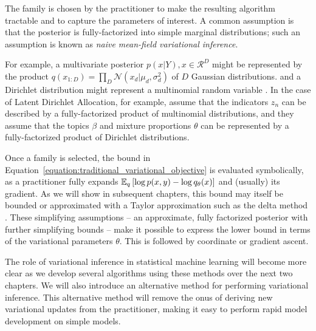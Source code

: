 The family is chosen by the practitioner to make the
resulting algorithm tractable and to capture the parameters of
interest. A common assumption is that the posterior is
fully-factorized into simple marginal distributions; such an
assumption is known as \emph{naive mean-field variational inference}.

For example, a multivariate posterior $p(x | Y), x \in \mathcal{R}^D$
might be represented by the product $q(x_{1:D}) = \prod_D \mathcal{N}(x_d | \mu_d,
\sigma_d^2)$ of $D$ Gaussian distributions. and a Dirichlet
distribution might represent a multinomial random variable
\cite{bishop:2006}.  In the case of Latent Dirichlet Allocation, for
example, \citet{blei:2003} assume that the indicators $z_n$ can be
described by a fully-factorized product of multinomial distributions,
and they assume that the topics $\beta$ and mixture proportions
$\theta$ can be represented by a fully-factorized product of Dirichlet
distributions.

Once a family is selected, the bound in
Equation~\ref{equation:traditional_variational_objective} is evaluated
symbolically, as a practitioner fully expands $\mathbb{E}_q\left[ \log p(x, y)
  - \log q_\theta(x)\right]$ and (usually) its gradient. As we will show in
subsequent chapters, this bound may itself be bounded or approximated
with a Taylor approximation such as the delta method
\cite{bickel:2007,braun:2007}. These simplifying assumptions -- an
approximate, fully factorized posterior with further simplifying
bounds -- make it possible to express the lower bound in terms of the
variational parameters $\theta$.  This is followed by coordinate or
gradient ascent.

The role of variational inference in statistical machine learning will
become more clear as we develop several algorithms using these methods
over the next two chapters.  We will also introduce an alternative
method for performing variational inference.  This alternative method
will remove the onus of deriving new variational updates from the
practitioner, making it easy to perform rapid model development on
simple models.


